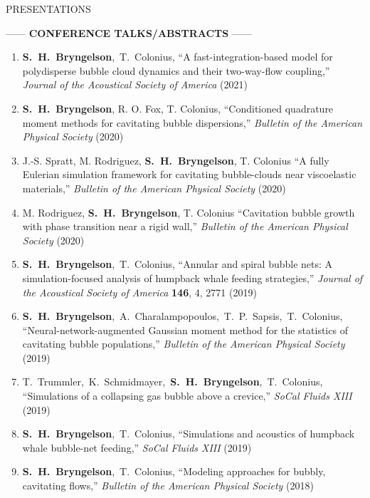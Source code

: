 \documentclass{resume} %
\makeatletter
\newlength{\bibhang}
\newlength{\bibsep}
\newenvironment{bibsection}%
        {\begin{enumerate}{}{%
       \setlength{\leftmargin}{\bibhang}%
       \setlength{\itemindent}{-\leftmargin}%
       \setlength{\itemsep}{\bibsep}%
       \setlength{\parsep}{\z@}%
        \setlength{\topsep}{0pt}}}
        {\end{enumerate}\vspace{-.1\baselineskip}}
\newcommand\SHB{\mbox{\textbf{S. H. Bryngelson}}}
\newcommand\SpencerTim{\mbox{\textbf{S. H. Bryngelson}, T. Colonius}}
\newcommand\Theresa{\mbox{T. Trummler, K. Schmidmayer, \textbf{S. H. Bryngelson}, T. Colonius}}
\newcommand\SpencerThemis{\mbox{\textbf{S. H. Bryngelson}, A. Charalampopoulos, T. P. Sapsis, T. Colonius}}
\newcommand{\APS}{Bulletin of the American Physical Society}
\makeatother
\begin{document}
\begin{rSection}{{\Large P}RESENTATIONS}

\smallskip
\begin{center}
    ------ \textbf{CONFERENCE TALKS/ABSTRACTS} ------
\end{center}

\begin{bibsection}
    \setlength{\itemsep}{\bibsep}%
    \item \SpencerTim, 
    ``A fast-integration-based model for polydisperse bubble cloud dynamics and their two-way-flow coupling,''
    \textit{Journal of the Acoustical Society of America} (2021)

    \item \SHB, R. O. Fox, T. Colonius, 
    ``Conditioned quadrature moment methods for cavitating bubble dispersions,''
	\textit{\APS} (2020)

    \item J.-S. Spratt, M. Rodriguez, \SHB, T. Colonius
    ``A fully Eulerian simulation framework for cavitating bubble-clouds near viscoelastic materials,''
	\textit{\APS} (2020)

    \item M. Rodriguez, \SHB, T. Colonius
    ``Cavitation bubble growth with phase transition near a rigid wall,''
	\textit{\APS} (2020)

    \item \SpencerTim, 
    ``Annular and spiral bubble nets: A simulation-focused analysis of humpback whale feeding strategies,''
    \textit{Journal of the Acoustical Society of America} \textbf{146}, 4, 2771 (2019)

    \item \SpencerThemis, 
    ``Neural-network-augmented Gaussian moment method for the statistics of cavitating bubble populations,''
	\textit{\APS} (2019)

	\item \Theresa, 
     ``Simulations of a collapsing gas bubble above a crevice,''
	\textit{SoCal Fluids XIII} (2019)

	\item \SpencerTim, 
    ``Simulations and acoustics of humpback whale bubble-net feeding,''
	\textit{SoCal Fluids XIII} (2019)

	\item \SpencerTim, 
    ``Modeling approaches for bubbly, cavitating flows,'' 
	\textit{\APS} (2018)


\end{bibsection}
\end{rSection}
\end{document}
